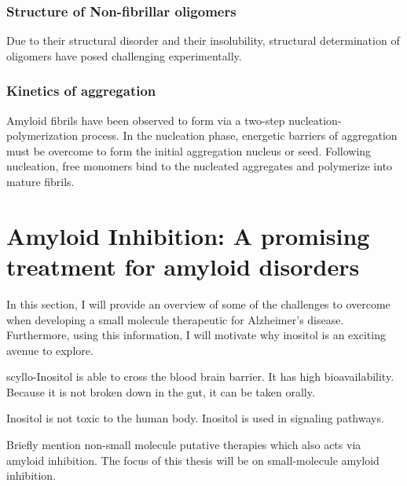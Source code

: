   \subsubsection{Structure of Non-fibrillar oligomers}
   Due to their structural disorder and their insolubility, structural determination of oligomers have posed challenging experimentally.
	
  \subsubsection{Kinetics of aggregation}
  Amyloid fibrils have been observed to form via a two-step nucleation-polymerization process. In the nucleation phase, energetic barriers of aggregation must be overcome to form the initial aggregation nucleus or seed.  Following nucleation, free monomers bind to the nucleated aggregates and polymerize into mature fibrils.\cite{Murphy:2002fe}


\section{Amyloid Inhibition: A promising treatment for amyloid disorders}
\begin{outline}
	\1 In this section, I will provide an overview of some of the challenges to overcome when developing a small molecule therapeutic for Alzheimer's disease.  Furthermore, using this information, I will motivate why inositol is an exciting avenue to explore.
	
	  \2 scyllo-Inositol is able to cross the blood brain barrier. It has high bioavailability. Because it is not broken down in the gut, it can be taken orally.
	  
	  \2 Inositol is not toxic to the human body.  Inositol is used in signaling pathways.

	\1 Briefly mention non-small molecule putative therapies which also acts via amyloid inhibition. The focus of this thesis will be on small-molecule amyloid inhibition.
\end{outline}

